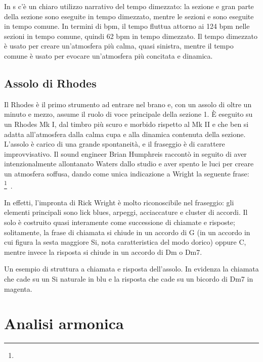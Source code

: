 \documentclass[class=book, crop=false, oneside, 12pt]{standalone}
\begin{document}
    In \acrshort{s} c'è un chiaro utilizzo narrativo del tempo dimezzato: la sezione  e gran parte della sezione  sono eseguite in tempo dimezzato, mentre le sezioni  e  sono eseguite in tempo comune. In termini di bpm, il tempo fluttua attorno ai 124 bpm nelle sezioni in tempo comune, quindi 62 bpm in tempo dimezzato. Il tempo dimezzato è usato per creare un'atmosfera più calma, quasi sinistra, mentre il tempo comune è usato per evocare un'atmosfera più concitata e dinamica.


    \subsection{Assolo di Rhodes}
    Il Rhodes è il primo strumento ad entrare nel brano e, con un assolo di oltre un minuto e mezzo, assume il ruolo di voce principale della sezione 1. È eseguito su un Rhodes Mk I, dal timbro più scuro e morbido rispetto al Mk II e che ben si adatta all'atmosfera dalla calma cupa e alla dinamica contenuta della sezione. L'assolo è carico di una grande spontaneità, e il fraseggio è di carattere improvvisativo. Il sound engineer Brian Humphreis raccontò in seguito di aver intenzionalmente allontanato Waters dallo studio e aver spento le luci per creare un atmosfera soffusa, dando come unica indicazione a Wright la seguente frase: \footnote{}~\cite{easlea2022raving}.

    
    In effetti, l'impronta di Rick Wright è molto riconoscibile nel fraseggio: gli elementi principali sono lick blues, arpeggi, acciaccature e cluster di accordi. Il solo è costruito quasi interamente come successione di chiamate e risposte; solitamente, la frase di chiamata si chiude in un accordo di G (in un accordo in cui figura la sesta maggiore Si, nota caratteristica del modo dorico) oppure C, mentre invece la risposta si chiude in un accordo di Dm o Dm7.

    \begin{sheet}[htb]
        \centering
        \caption[Un esempio di struttura a chiamata e risposta dell'assolo.]{Un esempio di struttura a chiamata e risposta dell'assolo. In evidenza la chiamata che cade su un Si naturale in blu e la risposta che cade su un bicordo di Dm7 in magenta.}
        \label{sheet:sheep-epiano_solo}
    \end{sheet}

    \section{Analisi armonica}
    \label{sec:03-harmony}
\end{document}
